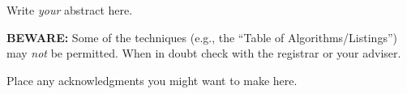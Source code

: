 \medskip

Write \emph{your} abstract here.
		
\textbf{BEWARE:} Some of the techniques (e.g., the ``Table of
Algorithms/Listings'') may \emph{not} be permitted.
When in doubt check with the registrar or your adviser.






\newpage
	

Place any acknowledgments you might want to make here.

\afterpreface
